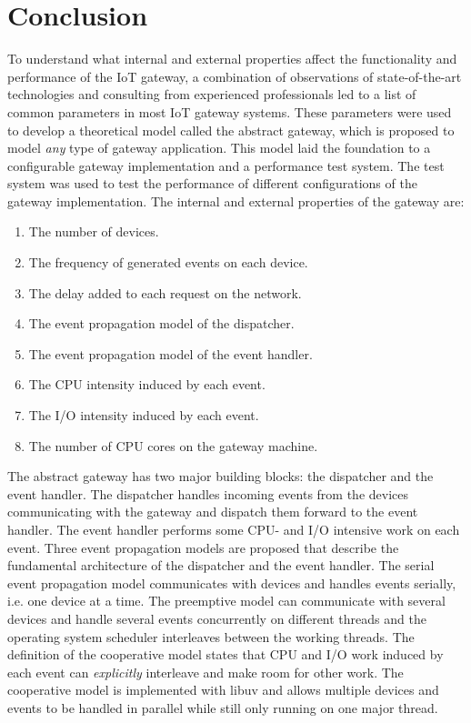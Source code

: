\chapter{Conclusion}
\label{cha:conclusion}

To understand what internal and external properties affect the functionality
and performance of the IoT gateway, a combination of observations of
state-of-the-art technologies and consulting from experienced professionals led
to a list of common parameters in most IoT gateway systems. These parameters
were used to develop a theoretical model called the abstract gateway, which is
proposed to model \textit{any} type of gateway application. This model laid the
foundation to a configurable gateway implementation and a performance test
system. The test system was used to test the performance of different
configurations of the gateway implementation. The internal and external
properties of the gateway are:

\begin{enumerate}

    \item The number of devices.
    \item The frequency of generated events on each device.
    \item The delay added to each request on the network.
    \item The event propagation model of the dispatcher.
    \item The event propagation model of the event handler.
    \item The CPU intensity induced by each event.
    \item The I/O intensity induced by each event.
    \item The number of CPU cores on the gateway machine.

\end{enumerate}

The abstract gateway has two major building blocks: the dispatcher and the
event handler. The dispatcher handles incoming events from the devices
communicating with the gateway and dispatch them forward to the event handler.
The event handler performs some CPU- and I/O intensive work on each event.
Three event propagation models are proposed that describe the fundamental
architecture of the dispatcher and the event handler. The serial event
propagation model communicates with devices and handles events serially, i.e.
one device at a time. The preemptive model can communicate with several devices
and handle several events concurrently on different threads and the operating
system scheduler interleaves between the working threads. The definition of the
cooperative model states that CPU and I/O work induced by each event can
\textit{explicitly} interleave and make room for other work. The cooperative
model is implemented with libuv and allows multiple devices and events to be
handled in parallel while still only running on one major thread.

